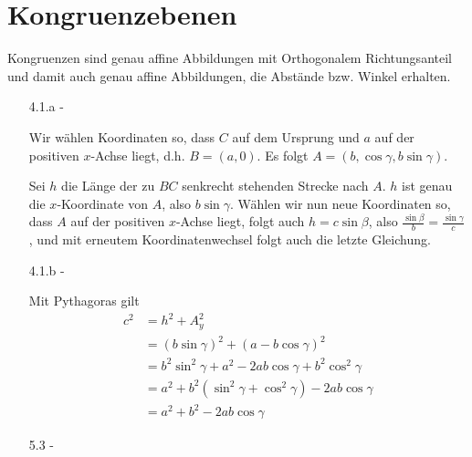 \documentclass{article}
\begin{document}
	\section*{Kongruenzebenen}
	\begin{theorem}
		Kongruenzen sind genau affine Abbildungen mit Orthogonalem Richtungsanteil und damit auch genau affine Abbildungen, die Abstände bzw. Winkel erhalten.
	\end{theorem}
	\begin{enumerate}
		\item[4.1.a - \tbf{4}]
	
		Wir wählen Koordinaten so, dass $C$ auf dem Ursprung und $a$ auf der positiven $x$-Achse liegt, d.h. $B = (a,0)$. Es folgt $A = (b, \cos \gamma, b \sin \gamma)$.
		
		Sei $h$ die Länge der zu $BC$ senkrecht stehenden Strecke nach $A$. $h$ ist genau die $x$-Koordinate von $A$, also $b \sin \gamma$. Wählen wir nun neue Koordinaten so, dass $A$ auf der positiven $x$-Achse liegt, folgt auch $h = c \sin \beta$, also $\frac{\sin \beta}{b} = \frac{\sin \gamma}{c}$, und mit erneutem Koordinatenwechsel folgt auch die letzte Gleichung.
		
		\item[4.1.b - \tbf{4}]
		
		Mit Pythagoras gilt
		\begin{align*}
			c^2 
			&= h^2 + A_y^2\\
			&= (b \sin \gamma)^2 + (a-b\cos \gamma)^2\\
			&= b^2 \sin^2 \gamma + a^2 - 2ab\cos\gamma + b^2\cos^2 \gamma\\
			&= a^2 + b^2 (\sin^2 \gamma + \cos^2 \gamma) - 2ab\cos\gamma\\
			&= a^2 + b^2 - 2ab\cos\gamma
		\end{align*}
		\item[5.3 -  \tbf{4}] 
		

\end{enumerate}
\end{document}
